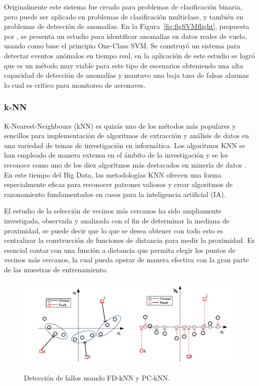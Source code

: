 \documentclass[11pt,a4paper,spanish]{book}
\numberwithin{equation}{chapter}
\numberwithin{figure}{chapter}
\begin{document}
Originalmente este sistema fue creado para problemas de clasificación binaria, pero 
puede ser aplicado en problemas de clasificación multiclase, y también en problemas de 
detección de anomalías. En la Figura~\ref{fig:figSVMflight}, propuesta por 
\cite{qin2022flight}, se presenta un estudio para identificar anomalías en datos reales 
de vuelo, usando como base el principio One-Class SVM. Se construyó un sistema para 
detectar eventos anómalos en tiempo real, en la aplicación de este estudio se logró que 
es un método muy viable para este tipo de escenarios obteniendo una alta capacidad de 
detección de anomalías y mantuvo una baja tasa de falsas alarmas lo cual es crítico para 
monitoreo de aeronaves.


\subsubsection{k-NN}


K-Nearest-Neighbours (kNN) es quizás uno de los métodos más populares y sencillos para 
implementación de algoritmos de extracción y análisis de datos en una variedad de temas 
de investigación en informática. Los algoritmos KNN se han empleado de manera extensa 
en el ámbito de la investigación y se les reconoce como uno de los diez algoritmos más 
destacados en minería de datos \cite{witten2005data}. En este tiempo del Big Data, 
las metodologías KNN ofrecen una forma especialmente eficaz para reconocer patrones 
valiosos y crear algoritmos de razonamiento fundamentados en casos para la inteligencia 
artificial (IA). \cite{wu2008top}


El estudio de la selección de vecinos más cercanos ha sido ampliamente investigada, 
observada y analizada con el fin de determinar la mediana de proximidad, se puede decir 
que lo que se desea obtener con todo esto es centralizar la construcción de funciones de 
distancia para medir la proximidad. Es esencial contar con una función a distancia que 
permita elegir los puntos de vecinos más cercanos, la cual pueda operar de manera 
efectiva con la gran parte de las muestras de entrenamiento. \cite{zhang2022influence}

\begin{figure}[h]
    \caption{Detección de fallos usando FD‑kNN y PC‑kNN. \protect\cite{zhou2015faultdetection}}
    \centering
    \includegraphics[width=1.0\textwidth]{media/knn-zhou.png}
    \label{fig:figKnnZhou}
\end{figure}
\end{document}
